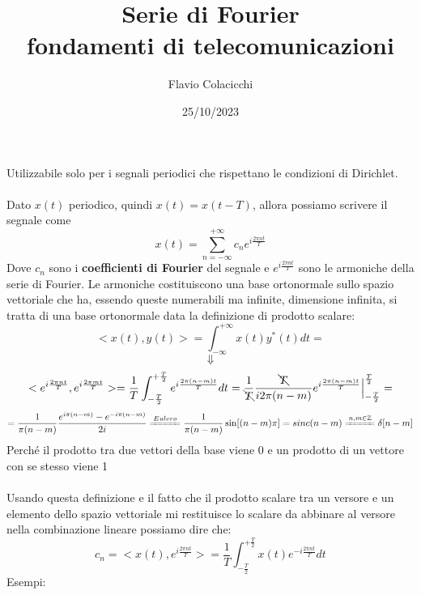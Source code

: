 \documentclass{article}
\title{Serie di Fourier\\\normalsize fondamenti di telecomunicazioni}
\author{Flavio Colacicchi}
\date{25/10/2023}
\newcommand{\accapo}{\\\hspace*{1cm}\\}
\begin{document}
\maketitle 
Utilizzabile solo per i segnali periodici che rispettano le condizioni di Dirichlet.\accapo
Dato \(x(t)\) periodico, quindi \(x(t)=x(t-T)\), allora possiamo scrivere il segnale come
\LARGE\[x(t)=\sum_{n=-\infty}^{+\infty}c_n e^{i\frac{2\pi nt}{T}}\]\normalsize
Dove \(c_n\) sono i \textbf{coefficienti di Fourier} del segnale e $e^{i\frac{2\pi nt}{T}}$ sono le armoniche della serie di Fourier. Le armoniche costituiscono una base ortonormale sullo spazio vettoriale che ha, essendo queste numerabili ma infinite, dimensione infinita, si tratta di una base ortonormale data la definizione di prodotto scalare:
\[<x(t),y(t)>=\int_{-\infty}^{+\infty}x(t)y^*(t)dt=\]
\[\Downarrow\]
\[<e^{i\frac{2\pi nt}{T}},e^{i\frac{2\pi mt}{T}}>=\frac{1}{T}\int_{-\frac{T}{2}}^{+\frac{T}{2}}e^{i\frac{2\pi(n-m)t}{T}}dt=\frac{1}{\bcancel{T}}\frac{\bcancel{T}}{i2\pi(n-m)}e^{i\frac{2\pi(n-m)t}{T}}\Big|_{-\frac{T}{2}}^{\frac{T}{2}}=\]
\[=\frac{1}{\pi(n-m)}\frac{e^{i\pi(n-m)}-e^{-i\pi(n-m)}}{2i}\xlongequal{Eulero}\frac{1}{\pi(n-m)}\sin[(n-m)\pi]=sinc(n-m)\xlongequal{n,m\in\mathbb{Z}}\delta[n-m]\]
Perché il prodotto tra due vettori della base viene 0 e un prodotto di un vettore con se stesso viene 1\accapo
Usando questa definizione e il fatto che il prodotto scalare tra un versore e un elemento dello spazio vettoriale mi restituisce lo scalare da abbinare al versore nella combinazione lineare possiamo dire che:
\[c_n=<x(t),e^{i\frac{2\pi nt}{T}}>=\frac{1}{T}\int_{-\frac{T}{2}}^{+\frac{T}{2}}x(t)e^{-i\frac{2\pi nt}{T}}dt\]
\newpage\large Esempi:\normalsize
\end{document}
